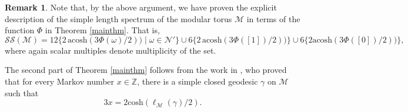 \documentclass[12pt,reqno]{amsart}
\numberwithin{equation}{part}
\theoremstyle{plain}
\theoremstyle{definition}
\newtheorem{remark}[theorem]{Remark}
\begin{document}
\begin{remark} \label{rk:spec} Note that, by the above argument, we have proven the explicit description of the simple length spectrum of the modular torus $\mathcal{M}$ in terms of the function $\Phi$ in Theorem \ref{mainthm}. That is, 
\[
\mathcal{SS}(\mathcal{M})=12\{2\,\mathrm{acosh}(3\Phi(\omega)/2))\mid \omega \in \mathcal{N}'\}\cup 6\{2\,\mathrm{acosh}(3\Phi([1])/2))\}\cup 6\{2\mathrm{acosh}(3\Phi([0])/2))\}, 
\]
where again scalar multiples denote multiplicity of the set.    
\end{remark}

The second part of Theorem \ref{mainthm} follows from the work in \cite{Coh71}, who proved that for every Markov number $x\in\mathbb{Z}$, there is a simple closed geodesic $\gamma$ on $\mathcal{M}$ such that \[3x=2\mathrm{cosh}(\ell_\mathcal{M}(\gamma)/2).\]
\end{document}
